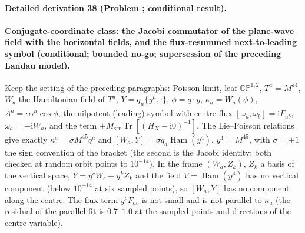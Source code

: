 \paragraph{Detailed derivation 38 (Problem ; conditional result).} \label{ref:detail-37} %



\paragraph{Conjugate-coordinate class: the Jacobi commutator of the plane-wave field with the horizontal fields, and the flux-resummed next-to-leading symbol (conditional; bounded no-go; supersession of the preceding Landau model).}

Keep the setting of the preceding paragraphs: Poisson limit, leaf \(\mathbb{CP}^{1,2}\), \(T^a=M^{a4}\), \(W_a\) the Hamiltonian field of \(T^a\), \(Y=q_\mu\{y^\mu,\cdot\}\), \(\phi=q\cdot y\), \(\kappa_a=W_a(\phi)\), \(A^a=\epsilon\alpha^a\cos\phi\), the nilpotent (leading) symbol with centre flux \([\omega_a,\omega_b]=\mathrm iF_{ab}\), \(\omega_a=-\mathrm iW_a\), and the term \(+M_{\mathrm{str}}\operatorname{Tr}[(H_X-\mathrm i0)^{-1}]\). The Lie--Poisson relations give exactly \(\kappa^a=\sigma M^{45}q^a\) and \([W_a,Y]=\sigma q_a\operatorname{Ham}(y^4)\), \(y^4=M^{45}\), with \(\sigma=\pm1\) the sign convention of the bracket (the second is the Jacobi identity; both checked at random orbit points to \(10^{-14}\)). In the frame \((W_a,Z_k)\), \(Z_k\) a basis of the vertical space, \(Y=y^cW_c+y^kZ_k\) and the field \(V=\operatorname{Ham}(y^4)\) has no vertical component (below \(10^{-14}\) at six sampled points), so \([W_a,Y]\) has no component along the centre. The flux term \(y^cF_{ac}\) is not small and is not parallel to \(\kappa_a\) (the residual of the parallel fit is \(0.7\)--\(1.0\) at the sampled points and directions of the centre variable).



